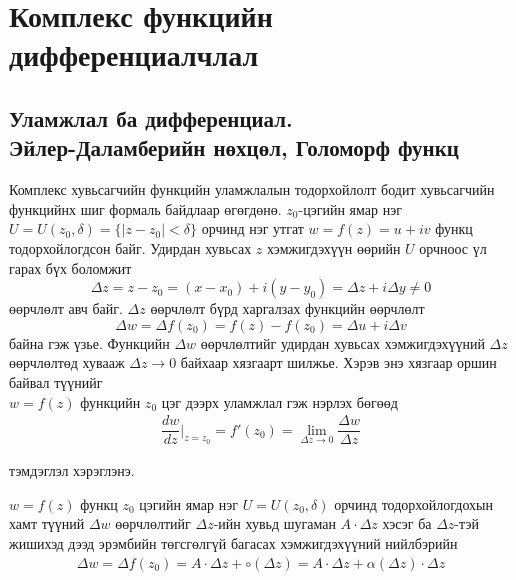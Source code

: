 \chapter{Комплекс функцийн дифференциалчлал}
\section{Уламжлал ба дифференциал. \\ 
Эйлер-Даламберийн нөхцөл, 
Голоморф функц}
Комплекс хувьсагчийн функцийн уламжлалын тодорхойлолт бодит хувьсагчийн функцийнх шиг формаль байдлаар өгөгдөнө. $z_0$-цэгийн ямар нэг $U=U(z_0,\delta)=\{|z-z_0|<\delta\}$ орчинд нэг утгат $w=f(z)=u+iv$ функц тодорхойлогдсон байг. Удирдан хувьсах $z$ хэмжигдэхүүн өөрийн $U$ орчноос үл гарах бүх боломжит
$$\Delta z=z-z_0=(x-x_0)+i(y-y_0)=\Delta z+i\Delta y\neq 0$$
өөрчлөлт авч байг. $\Delta z$ өөрчлөлт бүрд харгалзах функцийн өөрчлөлт
$$\Delta w=\Delta f(z_0)=f(z)-f(z_0) =\Delta u+i\Delta v$$
байна гэж үзье. Функцийн $\Delta w$ өөрчлөлтийг удирдан хувьсах хэмжигдэхүүний $\Delta z$ өөрчлөлтөд хувааж $\Delta z\rightarrow 0$ байхаар хязгаарт шилжье. Хэрэв энэ хязгаар оршин байвал түүнийг\\ $w=f(z)$ функцийн $z_0$ цэг дээрх уламжлал гэж нэрлэх бөгөөд 
\begin{eqnarray} \label{3.1}
 \dfrac{dw}{dz}\Big |_{z=z_0}=f'(z_0)=\lim\limits_{\Delta z\rightarrow 0}\dfrac{\Delta w}{\Delta z}
\end{eqnarray}

тэмдэглэл хэрэглэнэ. 

$w=f(z)$ функц $z_0$ цэгийн ямар нэг $U=U(z_0,\delta)$ орчинд тодорхойлогдохын хамт түүний $\Delta w$ өөрчлөлтийг $\Delta z$-ийн хувьд шугаман $A\cdot \Delta z$ хэсэг ба $\Delta z$-тэй жишихэд дээд эрэмбийн төгсгөлгүй багасах хэмжигдэхүүний нийлбэрийн
\begin{eqnarray} \label{3.2}
 \Delta w=\Delta f(z_0)=A\cdot \Delta z+\circ (\Delta z)=A\cdot \Delta z+\alpha (\Delta z)\cdot \Delta z
\end{eqnarray}

